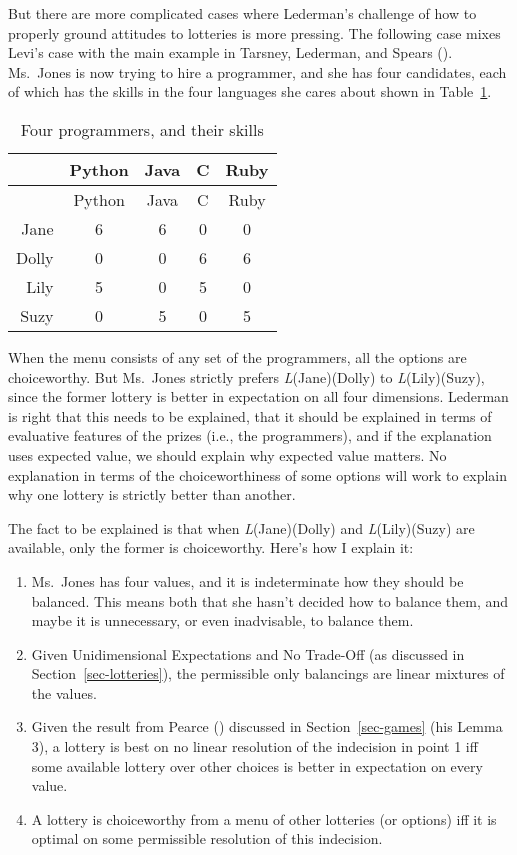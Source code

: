 \documentclass[
  11pt,
  letterpaper,
  DIV=11,
  numbers=noendperiod,
  twoside]{scrartcl}
\providecommand{\tightlist}{%
  \setlength{\itemsep}{0pt}\setlength{\parskip}{0pt}}
\begin{document}
But there are more complicated cases where Lederman's challenge of how
to properly ground attitudes to lotteries is more pressing. The
following case mixes Levi's case with the main example in Tarsney,
Lederman, and Spears ().
Ms.~Jones is now trying to hire a programmer, and she has four
candidates, each of which has the skills in the four languages she cares
about shown in Table~\ref{tbl-programmers}.

\begin{longtable}[]{@{}rcccc@{}}
\caption{Four programmers, and their
skills}\label{tbl-programmers}\tabularnewline
\toprule\noalign{}
& Python & Java & C & Ruby \\
\midrule\noalign{}
\endfirsthead
\toprule\noalign{}
& Python & Java & C & Ruby \\
\midrule\noalign{}
\endhead
\bottomrule\noalign{}
\endlastfoot
Jane & 6 & 6 & 0 & 0 \\
Dolly & 0 & 0 & 6 & 6 \\
Lily & 5 & 0 & 5 & 0 \\
Suzy & 0 & 5 & 0 & 5 \\
\end{longtable}

When the menu consists of any set of the programmers, all the options
are choiceworthy. But Ms.~Jones strictly prefers \emph{L}(Jane)(Dolly)
to \emph{L}(Lily)(Suzy), since the former lottery is better in
expectation on all four dimensions. Lederman is right that this needs to
be explained, that it should be explained in terms of evaluative
features of the prizes (i.e., the programmers), and if the explanation
uses expected value, we should explain why expected value matters. No
explanation in terms of the choiceworthiness of some options will work
to explain why one lottery is strictly better than another.

The fact to be explained is that when \emph{L}(Jane)(Dolly) and
\emph{L}(Lily)(Suzy) are available, only the former is choiceworthy.
Here's how I explain it:

\begin{enumerate}
\def\labelenumi{\arabic{enumi}.}
\tightlist
\item
  Ms.~Jones has four values, and it is indeterminate how they should be
  balanced. This means both that she hasn't decided how to balance them,
  and maybe it is unnecessary, or even inadvisable, to balance them.
\item
  Given Unidimensional Expectations and No Trade-Off (as discussed in
  Section~\ref{sec-lotteries}), the permissible only balancings are
  linear mixtures of the values.
\item
  Given the result from Pearce ()
  discussed in Section~\ref{sec-games} (his Lemma 3), a lottery is best
  on no linear resolution of the indecision in point 1 iff some
  available lottery over other choices is better in expectation on every
  value.
\item
  A lottery is choiceworthy from a menu of other lotteries (or options)
  iff it is optimal on some permissible resolution of this indecision.
\end{enumerate}
\end{document}
